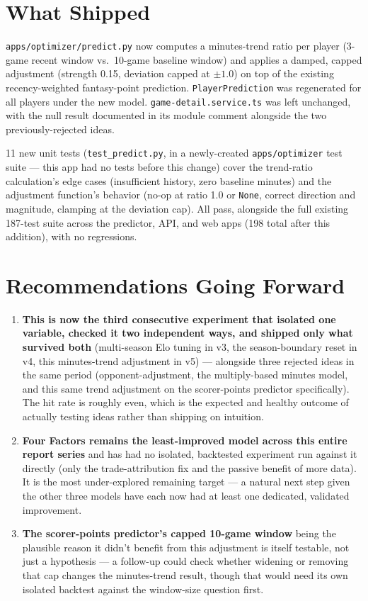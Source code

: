 \documentclass[11pt]{article}
\newcommand{\code}[1]{\allowbreak\texttt{\small #1}\allowbreak}
\begin{document}
\section{What Shipped}

\code{apps/optimizer/predict.py} now computes a minutes-trend ratio per player (3-game recent window vs.\
10-game baseline window) and applies a damped, capped adjustment (strength 0.15, deviation capped at
$\pm 1.0$) on top of the existing recency-weighted fantasy-point prediction. \code{PlayerPrediction} was
regenerated for all players under the new model. \code{game-detail.service.ts} was left unchanged, with the
null result documented in its module comment alongside the two previously-rejected ideas.

11 new unit tests (\code{test\_predict.py}, in a newly-created \code{apps/optimizer} test suite — this app had
no tests before this change) cover the trend-ratio calculation's edge cases (insufficient history, zero
baseline minutes) and the adjustment function's behavior (no-op at ratio 1.0 or \code{None}, correct
direction and magnitude, clamping at the deviation cap). All pass, alongside the full existing 187-test suite
across the predictor, API, and web apps (198 total after this addition), with no regressions.

\section{Recommendations Going Forward}

\begin{enumerate}
    \item \textbf{This is now the third consecutive experiment that isolated one variable, checked it two
    independent ways, and shipped only what survived both} (multi-season Elo tuning in v3, the season-boundary
    reset in v4, this minutes-trend adjustment in v5) — alongside three rejected ideas in the same period
    (opponent-adjustment, the multiply-based minutes model, and this same trend adjustment on the scorer-points
    predictor specifically). The hit rate is roughly even, which is the expected and healthy outcome of
    actually testing ideas rather than shipping on intuition.
    \item \textbf{Four Factors remains the least-improved model across this entire report series} and has had
    no isolated, backtested experiment run against it directly (only the trade-attribution fix and the passive
    benefit of more data). It is the most under-explored remaining target — a natural next step given the
    other three models have each now had at least one dedicated, validated improvement.
    \item \textbf{The scorer-points predictor's capped 10-game window} being the plausible reason it didn't
    benefit from this adjustment is itself testable, not just a hypothesis — a follow-up could check whether
    widening or removing that cap changes the minutes-trend result, though that would need its own isolated
    backtest against the window-size question first.
\end{enumerate}
\end{document}
